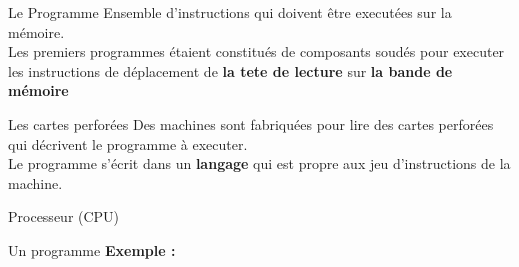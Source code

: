 \begin{frame}{Le Programme}
    Ensemble d'instructions qui doivent être executées sur la mémoire. \\
    \newline
    Les premiers programmes étaient constitués de composants soudés pour executer les instructions de déplacement de \textbf{la tete de lecture} sur \textbf{la bande de mémoire}
\end{frame}

\begin{frame}{Les cartes perforées}
    Des machines sont fabriquées pour lire des cartes perforées qui décrivent le programme à executer. \\
    Le programme s'écrit dans un \textbf{langage} qui est propre aux jeu d'instructions de la machine.
\end{frame}

\begin{frame}{Processeur (CPU)}
\end{frame}

\begin{frame}{Un programme}
    \textbf{Exemple :}
\end{frame}




